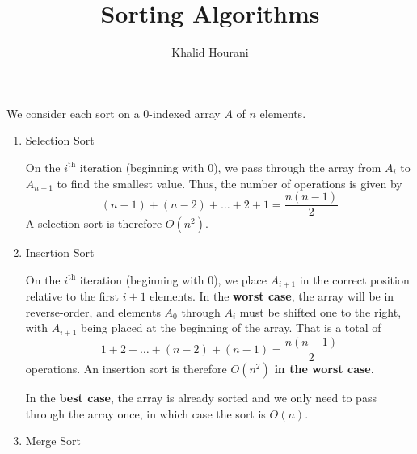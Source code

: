 \documentclass[a4paper]{article}
\title{Sorting Algorithms}
\author{Khalid Hourani}
\begin{document}
We consider each sort on a 0-indexed array $A$ of $n$ elements.
\begin{enumerate}
 \item Selection Sort
 
On the $i^{\text{th}}$ iteration (beginning with 0), we pass through the array from $A_i$ to $A_{n-1}$ to find the smallest value. Thus, the number of operations is given by \[(n-1)+(n-2)+\hdots+2+1=\frac{n(n-1)}{2}\] A selection sort is therefore $O(n^2)$.
 
 \item Insertion Sort
 
On the $i^{\text{th}}$ iteration (beginning with 0), we place $A_{i+1}$ in the correct position relative to the first $i+1$ elements. In the \textbf{worst case}, the array will be in reverse-order, and elements $A_0$ through $A_i$ must be shifted one to the right, with $A_{i+1}$ being placed at the beginning of the array. That is a total of \[1+2+\hdots+(n-2)+(n-1)=\frac{n(n-1)}{2}\] operations. An insertion sort is therefore $O(n^2)$ \textbf{in the worst case}.

In the \textbf{best case}, the array is already sorted and we only need to pass through the array once, in which case the sort is $O(n)$. 

 \item Merge Sort
\end{enumerate}
\end{document}
